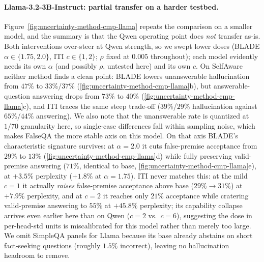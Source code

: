 \paragraph{Llama-3.2-3B-Instruct: partial transfer on a harder testbed.}
Figure~\ref{fig:uncertainty-method-cmp-llama} repeats the comparison on a
smaller model, and the summary is that the Qwen operating point does
\emph{not} transfer as-is. Both interventions over-steer at Qwen strength, so we
swept lower doses (BLADE $\alpha\!\in\!\{1.75,2.0\}$, ITI
$c\!\in\!\{1,2\}$; $\rho$ fixed at $0.005$ throughout); each model evidently
needs its own $\alpha$ (and possibly $\rho$, untested here) and its own $c$. On SelfAware neither method finds a clean point: BLADE lowers
unanswerable hallucination from $47\%$ to $33\%$/$37\%$
(\ref{fig:uncertainty-method-cmp-llama}b), but answerable-question answering
drops from $73\%$ to $40\%$ (\ref{fig:uncertainty-method-cmp-llama}c), and
ITI traces the same steep trade-off ($39\%$/$29\%$ hallucination against
$65\%$/$44\%$ answering). We also note that the unanswerable rate is quantized
at $1/70$ granularity here, so single-case differences fall within sampling
noise, which makes FalseQA the more stable axis on this model. On that axis BLADE's characteristic signature survives: at
$\alpha\!=\!2.0$ it cuts false-premise acceptance from $29\%$ to $13\%$
(\ref{fig:uncertainty-method-cmp-llama}d) while fully preserving
valid-premise answering ($71\%$, identical to base,
\ref{fig:uncertainty-method-cmp-llama}e), at $+3.5\%$ perplexity
($+1.8\%$ at $\alpha\!=\!1.75$). ITI never matches this: at the mild $c\!=\!1$ it
actually \emph{raises} false-premise acceptance above base ($29\%\!\to\!31\%$) at
$+7.9\%$ perplexity, and at $c\!=\!2$ it reaches only $21\%$ acceptance while
cratering valid-premise answering to $55\%$ at $+45.8\%$ perplexity; its capability collapse arrives even earlier here than on Qwen
($c\!=\!2$ vs.\ $c\!=\!6$), suggesting the dose in per-head-std units is
miscalibrated for this model rather than merely too large. We omit SimpleQA
panels for Llama because its base already abstains on short fact-seeking
questions (roughly $1.5\%$ incorrect), leaving no hallucination headroom to
remove.

